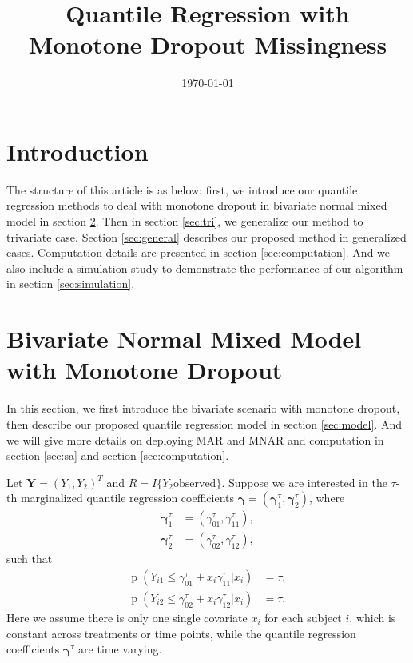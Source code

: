 \documentclass[12pt]{article}
\title{Quantile Regression with Monotone Dropout Missingness}
\date{\today}
\author{}
\DeclareMathOperator{\pr}{p}
\begin{document}
\maketitle{}

\section{Introduction}
The structure of this article is as below: first, we introduce our
quantile regression methods to deal with monotone dropout in bivariate
normal mixed model in section \ref{sec:bi}. Then in section
\ref{sec:tri}, we generalize our method to trivariate case. Section
\ref{sec:general} describes our proposed method in generalized cases.
Computation details are presented in section
\ref{sec:computation}. And we also include a simulation study to
demonstrate the performance of our algorithm in section
\ref{sec:simulation}.

\section{Bivariate Normal Mixed Model with Monotone Dropout}
\label{sec:bi}

In this section, we first introduce the bivariate scenario with
monotone dropout, then describe our proposed quantile regression model
in section \ref{sec:model}. And we will give more details on deploying
MAR and MNAR and computation in section \ref{sec:sa} and section
\ref{sec:computation}.

Let $\bm{Y} = (Y_{1}, Y_{2})^{T}$ and $R = I\{Y_2 \text{
  observed}\}$. Suppose we are interested in the $\tau$-th
marginalized quantile regression coefficients $\bm \gamma = (\bm
\gamma^{\tau}_1, \bm \gamma^{\tau}_2)$, where
\begin{align*}
  \bm \gamma_1^{\tau} & = (\gamma_{01}^{\tau}, \gamma^{\tau}_{11}), \\
  \bm \gamma_{2}^{\tau} & = (\gamma_{02}^{\tau}, \gamma^{\tau}_{12}),
\end{align*}
such that
\begin{align}
  \label{eq:quan1}
  \pr (Y_{i1} \leq \gamma^{\tau}_{01} + x_i \gamma^{\tau}_{11} | x_i ) & = \tau ,\\
  \label{eq:quan2}
  \pr (Y_{i2} \leq \gamma^{\tau}_{02} + x_i \gamma^{\tau}_{12} | x_i )
  & = \tau .
\end{align}
Here we assume there is only one single covariate $x_i$ for each
subject $i$, which is constant across treatments or time points, while
the quantile regression coefficients $\bm \gamma^{\tau}$ are time
varying.
\end{document}
